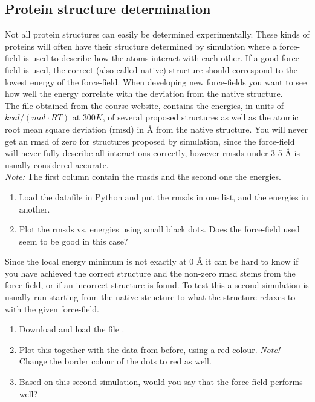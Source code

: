 \documentclass{article}
\begin{document}
\newpage
\subsection{Protein structure determination}

Not all protein structures can easily be determined experimentally.
These kinds of proteins will often have their structure determined by simulation where a force-field is used to describe how the atoms interact with each other.
If a good force-field is used, the correct (also called native) structure should correspond to the lowest energy of the force-field.
When developing new force-fields you want to see how well the energy correlate with the deviation from the native structure.\\

The file  obtained from the course website, contains the energies, in units of $kcal/(mol\cdot RT)$ at $300K$, of several proposed structures as well as the atomic root mean square deviation (rmsd) in Å from the native structure.
You will never get an rmsd of zero for structures proposed by simulation, since the force-field will never fully describe all interactions correctly, however rmsds under 3-5 Å is usually considered accurate.\\

\emph{Note:} The first column contain the rmsds and the second one the energies.


\begin{enumerate}[start=1]

    \item Load the datafile in Python and put the rmsds in one list, and the energies in another.

    \item Plot the rmsds vs. energies using small black dots. Does the force-field used seem to be good in this case?

\end{enumerate}

Since the local energy minimum is not exactly at 0 Å it can be hard to know if you have achieved the correct structure and the non-zero rmsd stems from the force-field, or if an incorrect structure is found.
To test this a second simulation is usually run starting from the native structure to what the structure relaxes to with the given force-field.


\begin{enumerate}[resume]

    \item Download and load the file .

    \item Plot this together with the data from before, using a red colour. \emph{Note!} Change the border colour of the dots to red as well.

    \item Based on this second simulation, would you say that the force-field performs well?

\end{enumerate}
\end{document}

